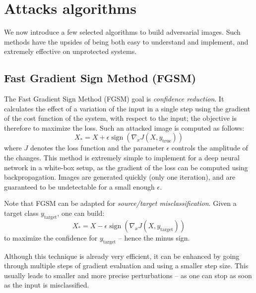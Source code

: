 \documentclass[twocolumn]{../../cs-classes/cs-classes}
\DeclareMathOperator*{\sign}{sign}
\begin{document}

\section{Attacks algorithms}
\label{sec:attacks-algorithms}
We now introduce a few selected algorithms to build adversarial images. Such methods have the upsides of being both easy to understand and implement, and extremely effective on unprotected systems.

\subsection{Fast Gradient Sign Method (FGSM)}
The Fast Gradient Sign Method (FGSM) \cite{goodfellow2014explaining} goal is \emph{confidence reduction}. It calculates the effect of a variation of the input in a single step using the gradient of the cost function of the system, with respect to the input; the objective is therefore to maximize the loss. Such an attacked image is computed as follows:
\begin{equation*}
    X_* = X + \epsilon\sign\left(\nabla_x J(X, y_{\text{true}})\right)
\end{equation*}
where $J$ denotes the loss function and the parameter $\epsilon$ controls the amplitude of the changes.
This method is extremely simple to implement for a deep neural network in a white-box setup, as the gradient of the loss can be computed using backpropagation. Images are generated quickly (only one iteration), and are guaranteed to be undetectable for a small enough $\epsilon$.

Note that FGSM can be adapted for \emph{source/target misclassification}. Given a target class $y_{\text{target}}$, one can build:
\begin{equation*}
    X_* = X - \epsilon\sign\left(\nabla_x J(X, y_{\text{target}})\right)
\end{equation*}
to maximize the confidence for $y_{\text{target}}$ -- hence the minus sign.

Although this technique is already very efficient, it can be enhanced by going through multiple steps of gradient evaluation and using a smaller step size. This usually leads to smaller and more precise perturbations -- as one can stop as soon as the input is misclassified.
\end{document}
